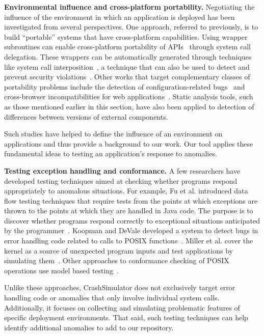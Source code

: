 \noindent
{\bf Environmental influence and cross-platform portability.}
Negotiating the influence of the environment in which an
application is deployed has been investigated from several
perspectives. One approach, referred to previously,
is to build ``portable'' systems
that have cross-platform capabilities.
Using wrapper subroutines
can enable cross-platform portability
of APIs~\cite{bartolomeicompliance} through system call delegation.
These wrappers can be automatically generated through techniques like
system call interposition~\cite{Guo:2011:CUS:2002181.2002202}, a
technique that can also be used to detect and prevent security
violations~\cite{Hofmeyr:1998:IDU:1298081.1298084,
Acharya:2000:MUP:1251306.1251307}.
Other works that target complementary classes of portability problems
include the detection of configuration-related bugs~\cite{skoll:icse:2004,
Yilmaz:issta:2004, Fouche:issta:2009, Kastner12, Nguyen14} and
cross-browser incompatibilities for web
applications~\cite{DBLP:conf/icsm/ChoudharyVO10, silakov2010improving,
DBLP:conf/icse/Choudhary11, Mesbah:2011:ACC:1985793.1985870,
DBLP:conf/icst/DallmeierP0MZ14}.  Static analysis tools, such as those
mentioned earlier in this section, have also been applied to
detection of differences between versions of external components.

Such studies have helped to define the influence of an environment on
applications and thus provide a background to our work.  Our tool applies
these fundamental ideas to testing an application's response to anomalies.

\noindent
{\bf Testing exception handling and conformance.}
A few researchers have developed testing techniques aimed at checking
whether programs respond appropriately to anomalous situations.  For
example, Fu et al. introduced data flow testing techniques that require
tests from the points at which exceptions are thrown to the points
at which they are handled in Java code. The purpose is to discover whether
programs respond correctly to exceptional situations anticipated by the
programmer~\cite{DBLP:journals/tse/FuMRW05}.  Koopman and DeVale developed
a system to detect bugs in error handling code related to calls to POSIX
functions~\cite{Koopman00theexception}.  Miller et al. cover the kernel as
a source of unexpected program inputs and test applications by simulating
them~\cite{murphyslaw}.
Other approaches to conformance checking of POSIX operations use model
based testing~\cite{Dadeau:2008:CSM:1433121.1433137,Farchi02}.

Unlike these approaches, CrashSimulator does not exclusively target error
handling code or anomalies that only involve individual system calls.
Additionally, it focuses on collecting and simulating
problematic features of specific
deployment environments.
That said, such testing techniques
can help identify additional anomalies  to add to our repository.

